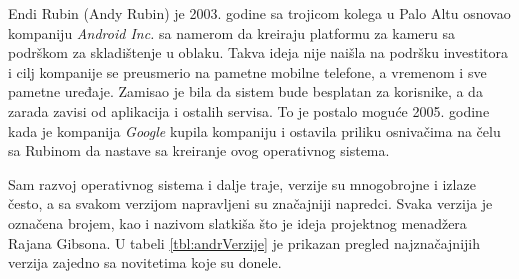 \documentclass[android.tex]{subfiles}
\begin{document}
Endi Rubin (Andy Rubin) je 2003. godine sa trojicom kolega u Palo Altu osnovao kompaniju \textit{Android Inc. }sa namerom da kreiraju platformu za kameru sa podrškom za skladištenje u oblaku. Takva ideja nije naišla na podršku investitora i cilj kompanije se preusmerio na  pametne mobilne telefone, a vremenom i sve pametne uređaje. Zamisao je bila da sistem bude besplatan za korisnike, a da zarada zavisi od aplikacija i ostalih servisa. To je postalo moguće 2005. godine kada je kompanija \textit{Google} kupila kompaniju i ostavila priliku osnivačima na čelu sa Rubinom da nastave sa kreiranje ovog operativnog sistema. \cite{book:krajci}

Sam razvoj operativnog sistema i dalje traje, verzije su mnogobrojne i izlaze često, a sa svakom verzijom napravljeni su značajniji napredci. \cite{sajt:androidDevelopers,book:mzivkovic} Svaka verzija je označena brojem, kao i nazivom slatkiša što je ideja projektnog menadžera Rajana Gibsona. U tabeli \ref{tbl:andrVerzije} je prikazan pregled najznačajnijih verzija zajedno sa novitetima koje su donele. 
\end{document}
